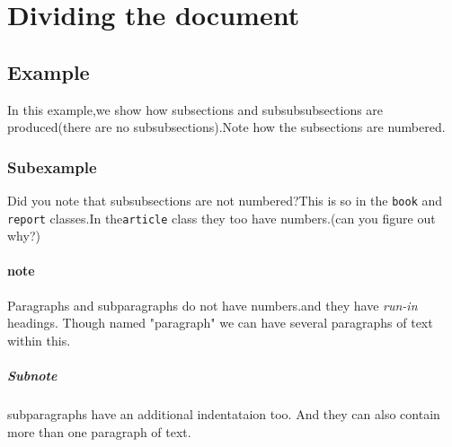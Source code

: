 
	\section{Dividing the document}
	\subsection{Example}
	In this example,we show how subsections and subsubsubsections are produced(there are no subsubsections).Note how the subsections are numbered.
	\subsubsection{Subexample}
	Did you note that subsubsections are not numbered?This is so in the \texttt{book} and \texttt{report} classes.In the\texttt{article} class they too have numbers.(can you figure out why?)
	\paragraph{note}
	Paragraphs and subparagraphs do not have numbers.and they have
	\textit{run-in} headings.
	Though named "paragraph" we can have several paragraphs of text within this.
	\subparagraph{Subnote}
	subparagraphs have an additional indentataion too.
	And they can also contain more than one paragraph of text.
	